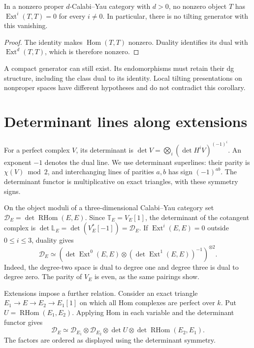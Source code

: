 \begin{corollary}\label{cygeom:cor:no-tilting}
In a nonzero proper $d$-Calabi--Yau category with $d>0$, no nonzero
object $T$ has $\operatorname{Ext}^i(T,T)=0$ for every $i\ne0$.
In particular, there is no tilting generator with this vanishing.
\end{corollary}

\begin{proof}
The identity makes $\operatorname{Hom}(T,T)$ nonzero. Duality identifies
its dual with $\operatorname{Ext}^d(T,T)$, which is therefore nonzero.
\end{proof}

A compact generator can still exist. Its endomorphisms must retain their
dg structure, including the class dual to its identity. Local tilting
presentations on nonproper spaces have different hypotheses and do not
contradict this corollary.

\section{Determinant lines along extensions}
\label{cygeom:sec:orientation}

For a perfect complex $V$, its determinant is
$\det V=\bigotimes_i(\det H^iV)^{(-1)^i}$. An exponent $-1$ denotes
the dual line. We use determinant superlines: their parity is
$\chi(V)\bmod2$, and interchanging lines of parities $a,b$ has sign
$(-1)^{ab}$. The determinant functor is multiplicative on exact
triangles, with these symmetry signs.

On the object moduli of a three-dimensional Calabi--Yau category set
$\mathcal D_E=\det\operatorname{RHom}(E,E)$. Since
$\mathbb T_E=V_E[1]$, the determinant of the cotangent complex is
$\det\mathbb L_E=\det(V_E^*[-1])=\mathcal D_E$.
If $\operatorname{Ext}^i(E,E)=0$ outside $0\leq i\leq3$, duality gives
\begin{equation}\label{cygeom:eq:det-square}
 \mathcal D_E\simeq
 \left(\det\operatorname{Ext}^0(E,E)\otimes
       (\det\operatorname{Ext}^1(E,E))^{-1}\right)^{\otimes2}.
\end{equation}
Indeed, the degree-two space is dual to degree one and degree three
is dual to degree zero. The parity of $V_E$ is even, as the same
pairings show.

Extensions impose a further relation. Consider an exact triangle
$E_1\to E\to E_2\to E_1[1]$ on which all Hom complexes are perfect
over $k$. Put $U=\operatorname{RHom}(E_1,E_2)$.
Applying Hom in each variable and the determinant functor gives
\[
 \mathcal D_E\simeq
 \mathcal D_{E_1}\otimes\mathcal D_{E_2}\otimes
 \det U\otimes\det\operatorname{RHom}(E_2,E_1).
\]
The factors are ordered as displayed using the determinant symmetry.

